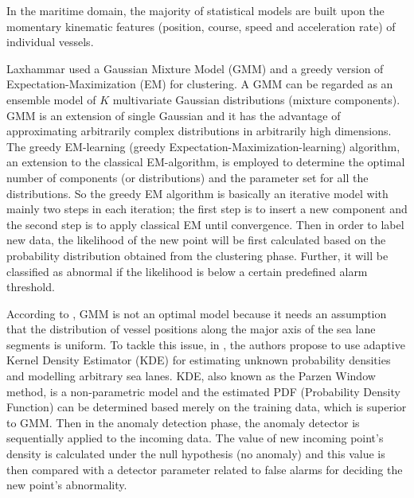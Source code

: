 \documentclass[12pt,glossary]{dalcsthesis}
\begin{document}
In the maritime domain, the majority of statistical models are built upon the momentary kinematic features (position, course, speed and acceleration rate) of individual vessels. 

Laxhammar \cite{gmm} used a Gaussian Mixture Model (GMM)  and a greedy version of Expectation-Maximization (EM) for clustering. A GMM can be regarded as an ensemble model of $K$ multivariate Gaussian distributions (mixture components). GMM is an extension of single Gaussian and it has the advantage of approximating arbitrarily complex distributions in arbitrarily high dimensions.  The greedy EM-learning (greedy Expectation-Maximization-learning) algorithm, an extension to the classical EM-algorithm,  is employed to determine the optimal number of components (or distributions) and the parameter set for all the distributions. So the greedy EM algorithm is basically an iterative model with mainly two steps in each iteration; the first step is to insert a new component and the second step is to apply classical EM until convergence.  Then in order to label new data, the likelihood of the new point will be first calculated based on the probability distribution obtained from the clustering phase. Further, it will be classified as abnormal if the likelihood is below a certain predefined alarm threshold.

According to \cite{comparison}, GMM is not an optimal model because it needs an assumption that the distribution of vessel positions along the major axis of the sea lane segments is uniform.  To tackle this issue, in \cite{kde}, the authors propose to use adaptive Kernel Density Estimator (KDE) for estimating unknown probability densities and modelling arbitrary sea lanes.  KDE, also known as the Parzen Window method, is a non-parametric model and the estimated PDF (Probability Density Function) can be determined based merely on the training data, which is superior to GMM. Then in the anomaly detection phase, the anomaly detector is sequentially applied to the incoming data. The value of new incoming point's density is calculated under the null hypothesis (no anomaly) and this value is then compared with a detector parameter related to false alarms for deciding the new point's abnormality.

\end{document}
